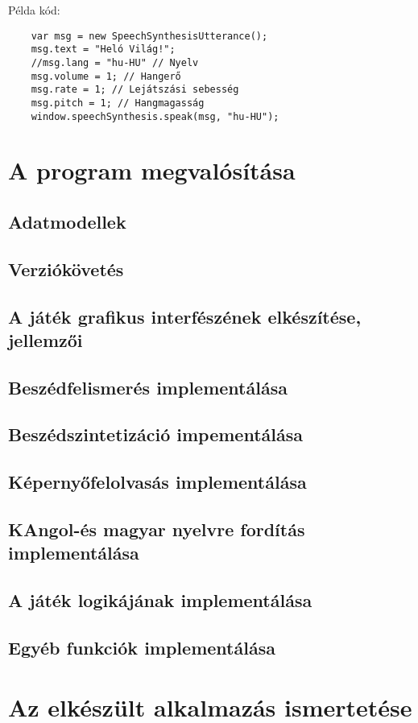 \documentclass[12pt]{report}
\begin{document}
Példa kód:
\begin{verbatim}
    var msg = new SpeechSynthesisUtterance();
    msg.text = "Heló Világ!";
    //msg.lang = "hu-HU" // Nyelv
    msg.volume = 1; // Hangerő
    msg.rate = 1; // Lejátszási sebesség
    msg.pitch = 1; // Hangmagasság
    window.speechSynthesis.speak(msg, "hu-HU");
\end{verbatim}
\pagebreak
\chapter{A program megvalósítása}
\section{Adatmodellek}
\section{Verziókövetés}
\section{A játék grafikus interfészének elkészítése, jellemzői}
\section{Beszédfelismerés implementálása}
\section{Beszédszintetizáció impementálása}
\section{Képernyőfelolvasás implementálása}
\section{KAngol-és magyar nyelvre fordítás implementálása}
\section{A játék logikájának implementálása}
\section{Egyéb funkciók implementálása}

\chapter{Az elkészült alkalmazás ismertetése}
\end{document}
